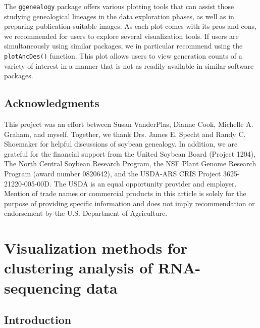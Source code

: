 \documentclass[11pt,a4paper,oldfontcommands,openany]{memoir}
\numberwithin{equation}{section} %
\newcommand{\code}[1]{{\texttt{#1}}}
\newcommand{\pkg}[1]{{\texttt{#1}}}
\begin{document}
The \pkg{ggenealogy} package offers various plotting tools that can assist those studying genealogical lineages in the data exploration phases, as well as in preparing publication-suitable images. As each plot comes with its pros and cons, we recommended for users to explore several visualization tools. If users are simultaneously using similar packages, we in particular recommend using the \code{plotAncDes()} function. This plot allows users to view generation counts of a variety of interest in a manner that is not as readily available in similar software packages.

\section{Acknowledgments}

This project was an effort between Susan VanderPlas, Dianne Cook, Michelle A. Graham, and myself. Together, we  thank Drs. James E. Specht and Randy C. Shoemaker for helpful discussions of soybean genealogy. In addition, we are grateful for the financial support from the United Soybean Board (Project 1204), The North Central Soybean Research Program, the NSF Plant Genome Research Program (award number 0820642), and the USDA-ARS CRIS Project 3625-21220-005-00D. The USDA is an equal opportunity provider and employer. Mention of trade names or commercial products in this article is solely for the purpose of providing specific information and does not imply recommendation or endorsement by the U.S. Department of Agriculture.











\chapter{Visualization methods for clustering analysis of RNA-sequencing data}
\label{sec:clustering}

\section{Introduction}
\end{document}
